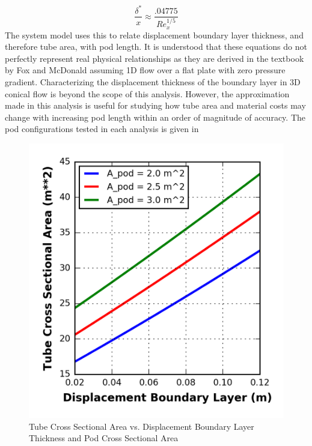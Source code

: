 \begin{equation}
	\label{eq:boundary_layer}
	\frac{\delta^{*}}{x} \approx  \frac{.04775}{Re_{x}^{1/5}}
\end{equation}
The system model uses this to relate displacement boundary layer thickness,
and therefore tube area, with pod length. It is understood that these equations
do not perfectly represent real physical relationships as they are derived in the 
textbook by Fox and McDonald assuming 1D flow over a
flat plate with zero pressure gradient. Characterizing the displacement
thickness of the boundary layer in 3D conical flow is beyond the scope of this analysis.
However, the approximation made in this analysis is useful for studying how
tube area and material costs may change with increasing pod length within an
order of magnitude of accuracy.  The pod configurations tested in each analysis is given in
\begin{table}
	\centering
	\caption{Configurations in boundary layer sensitivity study}
	\label{tbl:boundary_layer_sensitivty_configs}
\end{table}
\begin{figure}
	\centering
	\caption{Tube Cross Sectional Area vs. Displacement Boundary Layer Thickness and Pod Cross Sectional Area}
	\label{fig:cross_sec_area_vs_disp_boundary_layer}
	\includegraphics{../../images/graphs/boundary_layer_growth_trades/Tube_Area_vs_boundary_layer.png}
\end{figure}
